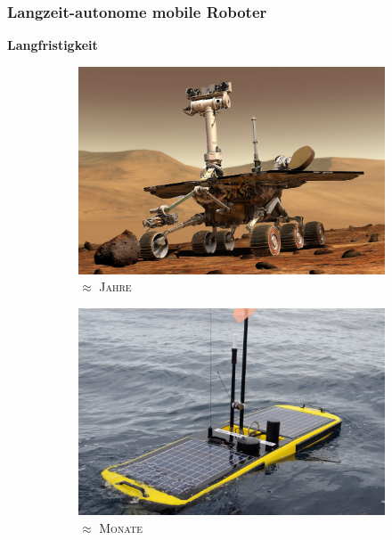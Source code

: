 \documentclass{beamer}
\begin{document}
\begin{frame}
  \frametitle{Langzeit-autonome mobile Roboter}
  \textbf{Langfristigkeit}
  \begin{figure}[H]
    \centering
    \begin{subfigure}[b]{0.32\textwidth}
      \centering
      \includegraphics[width=\textwidth]{img/mars_rover.jpg}
      \caption*{\textsc{$\approx$ Jahre \cite{MarsRover}}}
    \end{subfigure}
    \begin{subfigure}[b]{0.32\textwidth}
      \centering
      \includegraphics[width=\textwidth]{img/waveglider.jpg}
      \caption*{\textsc{$\approx$ Monate \cite{WaveGlider}}}
    \end{subfigure}
    \begin{subfigure}[b]{0.32\textwidth}
      \centering

\end{subfigure}
\end{figure}
\end{frame}
\end{document}
